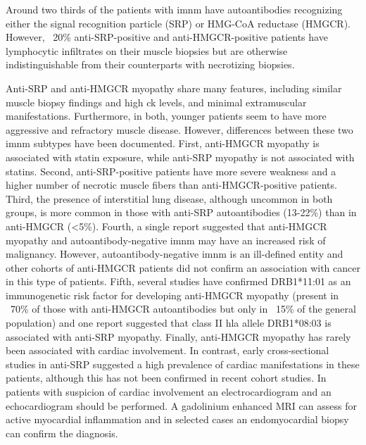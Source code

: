 Around two thirds of the patients with \gls{imnm} have autoantibodies recognizing either the signal recognition particle (SRP) or HMG-CoA reductase (HMGCR). However, ~20\% anti-SRP-positive and anti-HMGCR-positive patients have lymphocytic infiltrates on their muscle biopsies but are otherwise indistinguishable from their counterparts with necrotizing biopsies.\cite{Suzuki2015,Mammen2011,Allenbach2018}

Anti-SRP and anti-HMGCR myopathy share many features, including similar muscle biopsy findings and high \gls{ck} levels, and minimal extramuscular manifestations.\cite{Watanabe2016} Furthermore, in both, younger patients seem to have more aggressive and refractory muscle disease.\cite{PinalFernandez2017b,Tiniakou2017} However, differences between these two \gls{imnm} subtypes have been documented. First, anti-HMGCR myopathy is associated with statin exposure,\cite{ChristopherStine2010} while anti-SRP myopathy is not associated with statins.\cite{PinalFernandez2017b,Suzuki2015} Second, anti-SRP-positive patients have more severe weakness and a higher number of necrotic muscle fibers than anti-HMGCR-positive patients.\cite{PinalFernandez2017b,Watanabe2016,Allenbach2018} Third, the presence of interstitial lung disease, although uncommon in both groups, is more common in those with anti-SRP autoantibodies (13-22\%) than in anti-HMGCR (<5\%).\cite{PinalFernandez2017b,Suzuki2015,Watanabe2016,Tiniakou2017} Fourth, a single report suggested that anti-HMGCR myopathy and autoantibody-negative \gls{imnm} may have an increased risk of malignancy.\cite{Allenbach2016} However, autoantibody-negative \gls{imnm} is an ill-defined entity and other cohorts of anti-HMGCR patients did not confirm an association with cancer in this type of patients.\cite{Tiniakou2017,Watanabe2016} Fifth, several studies have confirmed DRB1*11:01 as an immunogenetic risk factor for developing anti-HMGCR myopathy (present in ~70\% of those with anti-HMGCR autoantibodies but only in ~15\% of the general population) and one report suggested that class II \gls{hla} allele DRB1*08:03 is associated with anti-SRP myopathy.\cite{Ohnuki2016,Mammen2012,Limaye2015} Finally, anti-HMGCR myopathy has rarely been associated with cardiac involvement.\cite{Watanabe2016} In contrast, early cross-sectional studies in anti-SRP suggested a high prevalence of cardiac manifestations in these patients,\cite{Targoff1990,Kao2004} although this has not been confirmed in recent cohort studies.\cite{PinalFernandez2017b,Suzuki2015,Watanabe2016} In patients with suspicion of cardiac involvement an electrocardiogram and an echocardiogram should be performed. A gadolinium enhanced MRI can assess for active myocardial inflammation and in selected cases an endomyocardial biopsy can confirm the diagnosis.\cite{Chen2018}


